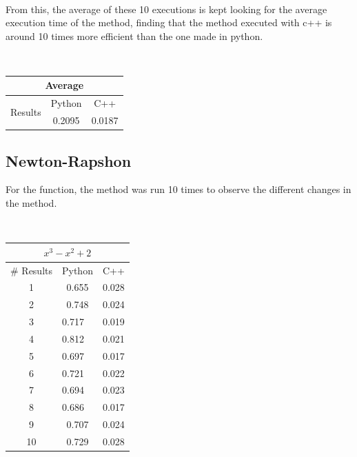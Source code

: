 \documentclass[conference]{IEEEtran}
\begin{document}
\


From this, the average of these 10 executions is kept looking for the average execution time of the method, finding that the method executed with c++ is around 10 times more efficient than the one made in python.

\

\begin{tabular}{|c|c|c|}
\hline
\multicolumn{3}{|c|}{Average}              \\ \hline
\multirow{2}{*}{Results} & Python & C++    \\ \cline{2-3} 
                         & 0.2095 & 0.0187 \\ \hline
\end{tabular}




\subsection{Newton-Rapshon}


For the function, the method was run 10 times to observe the different changes in the method.

\

\begin{tabular}{|c|l|l}
\hline
\multicolumn{3}{|c|}{\(x^3 - x^2+ 2\)}   \\ \hline
\# Results & \multicolumn{1}{c|}{Python} & \multicolumn{1}{c|}{C++}   \\ \hline
1          & \multicolumn{1}{c|}{0.655}  & \multicolumn{1}{c|}{0.028} \\ \hline
2          & \multicolumn{1}{c|}{0.748}  & \multicolumn{1}{c|}{0.024} \\ \hline
3          & 0.717                       & \multicolumn{1}{l|}{0.019} \\ \hline
4          & 0.812                       & \multicolumn{1}{l|}{0.021} \\ \hline
5          & 0.697                       & \multicolumn{1}{l|}{0.017} \\ \hline
6          & 0.721                       & \multicolumn{1}{l|}{0.022} \\ \hline
7          & 0.694                       & \multicolumn{1}{l|}{0.023} \\ \hline
8          & 0.686                       & \multicolumn{1}{l|}{0.017} \\ \hline
9          & \multicolumn{1}{c|}{0.707}  & \multicolumn{1}{c|}{0.024} \\ \hline
10         & \multicolumn{1}{c|}{0.729}  & \multicolumn{1}{c|}{0.028} \\ \hline
\end{tabular}
\end{document}
